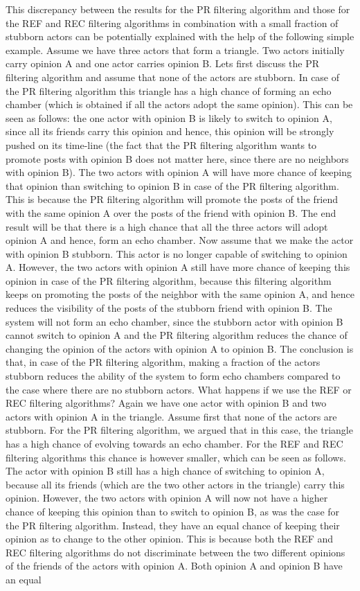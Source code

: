 \documentclass[11 pt , letterpaper , twoside , openright]{book}
\begin{document}
This discrepancy between the results for the PR filtering algorithm and those for the REF and REC filtering algorithms in combination with a small fraction of stubborn actors can be potentially explained with the help of the following simple example. Assume we have three actors that form a triangle. Two actors initially carry opinion A and one actor carries opinion B. Lets first discuss the PR filtering algorithm and assume that none of the actors are stubborn. In case of the PR filtering algorithm this triangle has a high chance of forming an echo chamber (which is obtained if all the actors adopt the same opinion). This can be seen as follows: the one actor with opinion B is likely to switch to opinion A, since all its friends carry this opinion and hence, this opinion will be strongly pushed on its time-line (the fact that the PR filtering algorithm wants to promote posts with opinion B does not matter here, since there are no neighbors with opinion B). The two actors with opinion A will have more chance of keeping that opinion than switching to opinion B in case of the PR filtering algorithm. This is because the PR filtering algorithm will promote the posts of the friend with the same opinion A over the posts of the friend with opinion B. The end result will be that there is a high chance that all the three actors will adopt opinion A and hence, form an echo chamber. Now assume that we make the actor with opinion B stubborn. This actor is no longer capable of switching to opinion A. However, the two actors with opinion A still have more chance of keeping this opinion in case of the PR filtering algorithm, because this filtering algorithm keeps on promoting the posts of the neighbor with the same opinion A, and hence reduces the visibility of the posts of the stubborn friend with opinion B. The system will not form an echo chamber, since the stubborn actor with opinion B cannot switch to opinion A and the PR filtering algorithm reduces the chance of changing the opinion of the actors with opinion A to opinion B. The conclusion is that, in case of the PR filtering algorithm, making a fraction of the actors stubborn reduces the ability of the system to form echo chambers compared to the case where there are no stubborn actors. What happens if we use the REF or REC filtering algorithms? Again we have one actor with opinion B and two actors with opinion A in the triangle. Assume first that none of the actors are stubborn. For the PR filtering algorithm, we argued that in this case, the triangle has a high chance of evolving towards an echo chamber. For the REF and REC filtering algorithms this chance is however smaller, which can be seen as follows. The actor with opinion B still has a high chance of switching to opinion A, because all its friends (which are the two other actors in the triangle) carry this opinion. However, the two actors with opinion A will now not have a higher chance of keeping this opinion than to switch to opinion B, as was the case for the PR filtering algorithm. Instead, they have an equal chance of keeping their opinion as to change to the other opinion. This is because both the REF and REC filtering algorithms do not discriminate between the two different opinions of the friends of the actors with opinion A. Both opinion A and opinion B have an equal 
\end{document}
